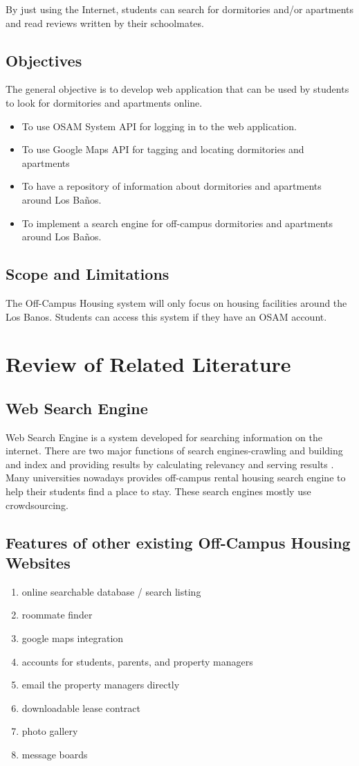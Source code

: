 \documentclass[journal]{./IEEE/IEEEtran}
\begin{document}
By just using the Internet, students can search for dormitories and/or apartments and read reviews written by their schoolmates. 
\subsection{Objectives}
The general objective is to develop web application that can be used by students  to look for dormitories and apartments online.
\pubidadjcol
	\begin{itemize}
	\item To use OSAM System API for logging in to the web application.
    \item To use Google Maps API for tagging and locating dormitories and apartments
	\item To have a repository of information about dormitories and apartments around Los Ba\~{n}os.
	\item To implement a search engine for off-campus dormitories and apartments around Los Ba\~{n}os.
	\end{itemize}

\subsection{Scope and Limitations}
The Off-Campus Housing system will only focus on housing facilities around the Los Banos. Students can access this system if they have an OSAM account. 


\section{Review of Related Literature}
\subsection{Web Search Engine}
Web Search Engine is a system developed for searching information on the internet. There are two major functions of search engines-crawling and building and index and providing results by calculating relevancy and serving results \cite{electronic_se}.  Many universities nowadays provides off-campus rental housing search engine to help their students find a place to stay. These search engines mostly use crowdsourcing. 
	\subsection{Features of other existing Off-Campus Housing Websites}
	\begin{enumerate}
		\item online searchable database / search listing
		\item roommate finder
		\item google maps integration
		\item accounts for students, parents, and property managers
		\item email the property managers directly
		\item downloadable lease contract
		\item photo gallery
		\item message boards
	\end{enumerate}
\end{document}
